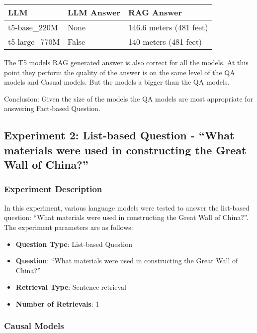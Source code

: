 \documentclass[11pt]{wseas}
\begin{document}
\begin{longtable}[]{@{}lll@{}}
\toprule\noalign{}
LLM & LLM Answer & RAG Answer \\
\midrule\noalign{}
\endhead
\bottomrule\noalign{}
\endlastfoot
t5-base\_220M & None & 146.6 meters (481 feet) \\
t5-large\_770M & False & 140 meters (481 feet) \\
\end{longtable}

The T5 models RAG generated answer is also correct for all the models.
At this point they perform the quality of the answer is on the same
level of the QA models and Casual models. But the models a bigger than
the QA models.

Conclusion: Given the size of the models the QA models are most
appropriate for answering Fact-based Question.

    \newpage

\subsection{Experiment 2: List-based Question - ``What materials were
used in constructing the Great Wall of
China?''}\label{experiment-2-list-based-question---what-materials-were-used-in-constructing-the-great-wall-of-china}

\subsubsection{Experiment Description}\label{experiment-description}

In this experiment, various language models were tested to answer the
list-based question: ``What materials were used in constructing the
Great Wall of China?''. The experiment parameters are as follows:

\begin{itemize}
\tightlist
\item
  \textbf{Question Type}: List-based Question
\item
  \textbf{Question}: ``What materials were used in constructing the
  Great Wall of China?''
\item
  \textbf{Retrieval Type}: Sentence retrieval
\item
  \textbf{Number of Retrievals}: 1
\end{itemize}

\subsubsection{Causal Models}\label{causal-models}
\end{document}
